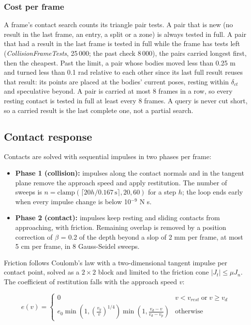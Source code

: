 \documentclass[Orbiter Technical Reference.tex]{subfiles}
\begin{document}
\subsubsection{Cost per frame}
A frame's contact search counts its triangle pair tests. A pair that is new (no result in the last frame, an entry, a split or a zone) is always tested in full. A pair that had a result in the last frame is tested in full while the frame has tests left (\textit{CollisionFrameTests}, 25\,000; the past check 8\,000), the pairs carried longest first, then the cheapest. Past the limit, a pair whose bodies moved less than 0.25 m and turned less than 0.1 rad relative to each other since its last full result reuses that result: its points are placed at the bodies' current poses, resting within $\delta_{ct}$ and speculative beyond. A pair is carried at most 8 frames in a row, so every resting contact is tested in full at least every 8 frames. A query is never cut short, so a carried result is the last complete one, not a partial search.

\subsection{Contact response}
Contacts are solved with sequential impulses in two phases per frame:

\begin{itemize}
\item \textbf{Phase 1 (collision):} impulses along the contact normals and in the tangent plane remove the approach speed and apply restitution. The number of sweeps is $n = \mathrm{clamp}(\lceil 20 h / 0.167\,\mathrm{s} \rceil, 20, 60)$ for a step $h$; the loop ends early when every impulse change is below 10$^{-9}$ N s.
\item \textbf{Phase 2 (contact):} impulses keep resting and sliding contacts from approaching, with friction. Remaining overlap is removed by a position correction of $\beta$ = 0.2 of the depth beyond a slop of 2 mm per frame, at most 5 cm per frame, in 8 Gauss-Seidel sweeps.
\end{itemize}

\noindent
Friction follows Coulomb's law with a two-dimensional tangent impulse per contact point, solved as a $2 \times 2$ block and limited to the friction cone $|J_t| \le \mu J_n$.\\
The coefficient of restitution falls with the approach speed $v$:

\[ e(v) = \left\{
\begin{array}{ll}
0 & v < v_{rest} \;\mathrm{or}\; v \ge v_{d} \\
e_{0} \min\left(1, \left(\frac{v_{y}}{v}\right)^{1/4}\right) \min\left(1, \frac{v_{d} - v}{v_{d} - v_{p}}\right) & \mathrm{otherwise}
\end{array}
\right. \]
\end{document}
